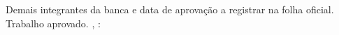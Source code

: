 \begin{folhadeaprovacao}

  \begin{center}
    {\ABNTEXchapterfont\large\imprimirautor}

    \vspace*{\fill}\vspace*{\fill}
    {\ABNTEXchapterfont\bfseries\Large\imprimirtitulo}
    \vspace*{\fill}
    
    \hspace{.45\textwidth}
    \begin{minipage}{.5\textwidth}
        \imprimirpreambulo
    \end{minipage}%
    \vspace*{\fill}
   \end{center}
    
   \ifx\imprimirdatadaaprovacao\empty
     Demais integrantes da banca e data de aprovação a registrar na folha oficial.
   \else
     Trabalho aprovado. \imprimirlocal, \imprimirdatadaaprovacao:
   \fi

      
   \begin{center}
    \vspace*{0.5cm}
    {\large\imprimirlocal}
    \par
    {\large\imprimirdata}
    \vspace*{1cm}
  \end{center}
  
\end{folhadeaprovacao}
